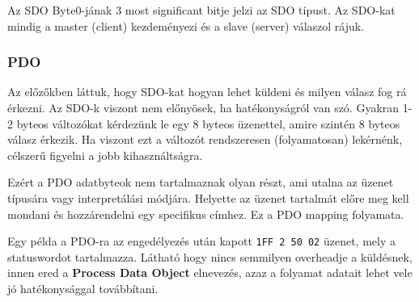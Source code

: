 		Az SDO Byte0-jának 3 most significant bitje jelzi az SDO típust. Az SDO-kat mindig a master (client) kezdeményezi és a slave (server) válaszol rájuk.
	
		
		\subsubsection{PDO}
		
%				
		
		
		Az előzőkben láttuk, hogy SDO-kat hogyan lehet küldeni és milyen válasz fog rá érkezni. 
		Az SDO-k viszont nem előnyösek, ha hatékonyságról van szó. Gyakran 1-2 byteos változókat kérdezünk le egy 8 byteos üzenettel, amire szintén 8 byteos válasz érkezik. Ha viszont ezt a változót rendszeresen (folyamatosan) lekérnénk, célszerű figyelni a jobb kihasználtságra.
		
		Ezért a PDO adatbyteok nem tartalmaznak olyan részt, ami utalna az üzenet típusára vagy interpretálási módjára. Helyette az üzenet tartalmát előre meg kell mondani és hozzárendelni egy specifikus címhez. Ez a PDO mapping folyamata.
		
		Egy példa a PDO-ra az engedélyezés után kapott \texttt{1FF 2 50 02} üzenet, mely a statuswordot tartalmazza. Látható hogy nincs semmilyen overheadje a küldésnek, innen ered a \textbf{Process Data Object} elnevezés, azaz a folyamat adatait lehet vele jó hatékonysággal továbbítani. 
		
